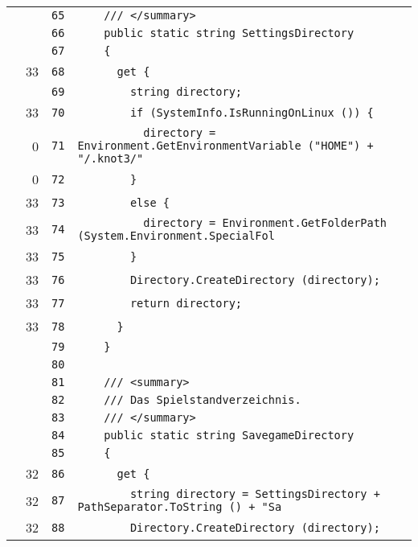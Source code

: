 \documentclass[a4paper,10pt]{article}
\begin{document}
\begin{longtable}[l]{lrrl}
\cellcolor{gray} &  & \verb~65~ & \verb~    /// </summary>~\\
\cellcolor{gray} &  & \verb~66~ & \verb~    public static string SettingsDirectory~\\
\cellcolor{gray} &  & \verb~67~ & \verb~    {~\\
\cellcolor{green} & 33 & \verb~68~ & \verb~      get {~\\
\cellcolor{gray} &  & \verb~69~ & \verb~        string directory;~\\
\cellcolor{green} & 33 & \verb~70~ & \verb~        if (SystemInfo.IsRunningOnLinux ()) {~\\
\cellcolor{red} & 0 & \verb~71~ & \verb~          directory = Environment.GetEnvironmentVariable ("HOME") + "/.knot3/"~\\
\cellcolor{red} & 0 & \verb~72~ & \verb~        }~\\
\cellcolor{green} & 33 & \verb~73~ & \verb~        else {~\\
\cellcolor{green} & 33 & \verb~74~ & \verb~          directory = Environment.GetFolderPath (System.Environment.SpecialFol~\\
\cellcolor{green} & 33 & \verb~75~ & \verb~        }~\\
\cellcolor{green} & 33 & \verb~76~ & \verb~        Directory.CreateDirectory (directory);~\\
\cellcolor{green} & 33 & \verb~77~ & \verb~        return directory;~\\
\cellcolor{green} & 33 & \verb~78~ & \verb~      }~\\
\cellcolor{gray} &  & \verb~79~ & \verb~    }~\\
\cellcolor{gray} &  & \verb~80~ & \verb~~\\
\cellcolor{gray} &  & \verb~81~ & \verb~    /// <summary>~\\
\cellcolor{gray} &  & \verb~82~ & \verb~    /// Das Spielstandverzeichnis.~\\
\cellcolor{gray} &  & \verb~83~ & \verb~    /// </summary>~\\
\cellcolor{gray} &  & \verb~84~ & \verb~    public static string SavegameDirectory~\\
\cellcolor{gray} &  & \verb~85~ & \verb~    {~\\
\cellcolor{green} & 32 & \verb~86~ & \verb~      get {~\\
\cellcolor{green} & 32 & \verb~87~ & \verb~        string directory = SettingsDirectory + PathSeparator.ToString () + "Sa~\\
\cellcolor{green} & 32 & \verb~88~ & \verb~        Directory.CreateDirectory (directory);~\\

\end{longtable}
\end{document}
